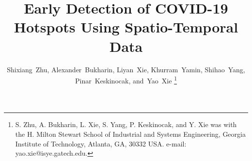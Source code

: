 \documentclass[journal]{IEEEtran}
\begin{document}
\title{Early Detection of COVID-19 Hotspots Using Spatio-Temporal Data}
%
%
%

\author{Shixiang~Zhu, 
        Alexander~Bukharin,
        Liyan~Xie,
        Khurram~Yamin,
        Shihao~Yang,
        Pinar~Keskinocak,
        and~Yao~Xie 
\thanks{S. Zhu, A. Bukharin, L. Xie, S. Yang, P. Keskinocak, and Y. Xie was with the H. Milton Stewart School of Industrial and Systems Engineering, Georgia Institute of Technology, Atlanta,
GA, 30332 USA. e-mail: yao.xie@isye.gatech.edu.}%
}

% 
%



% 
\end{document}
